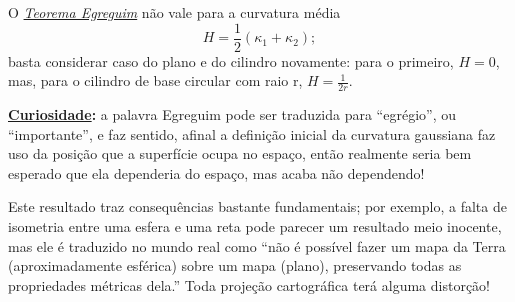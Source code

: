 \documentclass[../differential_geometry.tex]{subfiles}
\begin{document}
\begin{tcolorbox}[
		skin=enhanced,
		title=Observação,
		fonttitle=\bfseries,
		colframe=black,
		colbacktitle=cyan!75!white,
		colback=cyan!15,
		colbacklower=black,
		coltitle=black,
		drop fuzzy shadow,
	]
	O \hyperlink{egreguim_theorem}{\textit{Teorema Egreguim}} não vale para a curvatura média
	\[
		H = \frac{1}{2}(\kappa_1 + \kappa_2);
	\]
	basta considerar caso do plano e do cilindro novamente: para o primeiro, \(H = 0\), mas, para o cilindro de base circular com raio r, \(H = \frac{1}{2r}\).
\end{tcolorbox}

\textbf{\underline{Curiosidade}:} a palavra Egreguim pode ser traduzida para ``egrégio'', ou ``importante'', e faz sentido, afinal a definição inicial da curvatura gaussiana faz uso da posição que a superfície ocupa no espaço, então realmente seria bem esperado que ela dependeria do espaço, mas acaba não dependendo!

Este resultado traz consequências bastante fundamentais; por exemplo, a falta de isometria entre uma esfera e uma reta pode parecer um resultado meio inocente, mas ele é traduzido no mundo real como ``não é possível fazer um mapa da Terra (aproximadamente esférica) sobre um mapa (plano), preservando todas as propriedades métricas dela.'' Toda projeção cartográfica terá alguma distorção!
\end{document}
